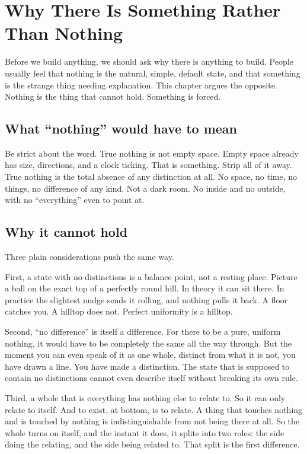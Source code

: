 \section{Why There Is Something Rather Than Nothing}

Before we build anything, we should ask why there is anything to build. People usually feel that nothing is the natural, simple, default state, and that something is the strange thing needing explanation. This chapter argues the opposite. Nothing is the thing that cannot hold. Something is forced.

\subsection{What ``nothing'' would have to mean}

Be strict about the word. True nothing is not empty space. Empty space already has size, directions, and a clock ticking. That is something. Strip all of it away. True nothing is the total absence of any distinction at all. No space, no time, no things, no difference of any kind. Not a dark room. No inside and no outside, with no ``everything'' even to point at.

\subsection{Why it cannot hold}

Three plain considerations push the same way.

First, a state with no distinctions is a balance point, not a resting place. Picture a ball on the exact top of a perfectly round hill. In theory it can sit there. In practice the slightest nudge sends it rolling, and nothing pulls it back. A floor catches you. A hilltop does not. Perfect uniformity is a hilltop.

Second, ``no difference'' is itself a difference. For there to be a pure, uniform nothing, it would have to be completely the same all the way through. But the moment you can even speak of it as one whole, distinct from what it is not, you have drawn a line. You have made a distinction. The state that is supposed to contain no distinctions cannot even describe itself without breaking its own rule.

Third, a whole that is everything has nothing else to relate to. So it can only relate to itself. And to exist, at bottom, is to relate. A thing that touches nothing and is touched by nothing is indistinguishable from not being there at all. So the whole turns on itself, and the instant it does, it splits into two roles: the side doing the relating, and the side being related to. That split is the first difference.


